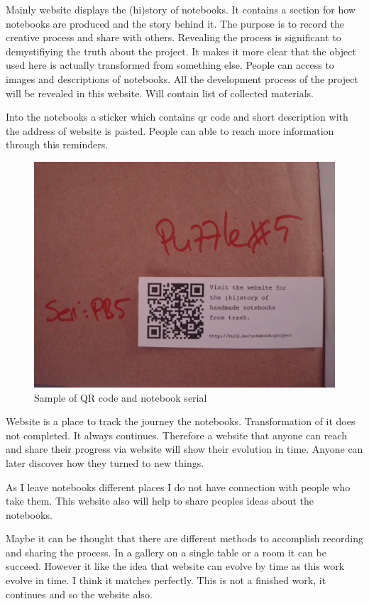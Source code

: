 Mainly website displays the (hi)story of notebooks. It contains a section for how notebooks are produced and the story behind it. The purpose is to record the creative process and share with others. Revealing the process is significant to demystifiying the truth about the project. It makes it more clear that the object used here is actually transformed from something else. People can access to images and descriptions of notebooks. All the development process of the project will be revealed in this website. Will contain list of collected materials. 

Into the notebooks a sticker which contains qr code and short description with the address of website is pasted. People can able to reach more information through this reminders. 

\begin{figure}[h!]
  \centering
  \includegraphics[width=1\textwidth]{project_graphics/qr_serial.jpg}
  \caption{Sample of QR code and notebook serial}
  \label{fig:QR}
\end{figure}

Website is a place to track the journey the notebooks. Transformation of it does not completed. It always continues. Therefore a website that anyone can reach and share their progress via website will show their evolution in time. Anyone can later discover how they turned to new things.

As I leave notebooks different places I do not have connection with people who take them. This website also will help to share peoples ideas about the notebooks.

Maybe it can be thought that there are different methods to accomplish recording and sharing the process. In a gallery on a single table or a room it can be succeed. However it like the idea that website can evolve by time as this work evolve in time. I think it matches perfectly. This is not a finished work, it continues and so the website also.

